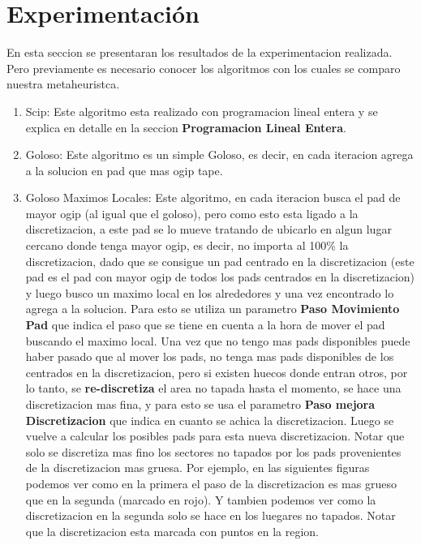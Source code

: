 \newpage
\section{Experimentación}\label{sec:experimentacion}

En esta seccion se presentaran los resultados de la experimentacion realizada. Pero previamente es necesario conocer los algoritmos con los cuales se comparo nuestra metaheuristca.

\begin{enumerate}
\item Scip: Este algoritmo esta realizado con programacion lineal entera y se explica en detalle en la seccion \textbf{Programacion Lineal Entera}.
\item Goloso: Este algoritmo es un simple Goloso, es decir, en cada iteracion agrega a la solucion en pad que mas ogip tape.
\item Goloso Maximos Locales: Este algoritmo, en cada iteracion busca el pad de mayor ogip (al igual que el goloso), pero como esto esta ligado a la discretizacion, a este pad se lo mueve tratando de ubicarlo en algun lugar cercano donde tenga mayor ogip, es decir, no importa al 100\% la discretizacion, dado que se consigue un pad centrado en la discretizacion (este pad es el pad con mayor ogip de todos los pads centrados en la discretizacion) y luego busco un maximo local en los alrededores y una vez encontrado lo agrega a la solucion.
Para esto se utiliza un parametro \textbf{Paso Movimiento Pad} que indica el paso que se tiene en cuenta a la hora de mover el pad buscando el maximo local. 
Una vez que no tengo mas pads disponibles puede haber pasado que al mover los pads, no tenga mas pads disponibles de los centrados en la discretizacion, pero si existen huecos donde entran otros, por lo tanto, se \textbf{re-discretiza} el area no tapada hasta el momento, se hace una discretizacion mas fina, y para esto se usa el parametro \textbf{Paso mejora Discretizacion} que indica en cuanto se achica la discretizacion. Luego se vuelve a calcular los posibles pads para esta nueva discretizacion. Notar que solo se discretiza mas fino los sectores no tapados por los pads provenientes de la discretizacion mas gruesa.
Por ejemplo, en las siguientes figuras podemos ver como en la primera el paso de la discretizacion es mas grueso que en la segunda (marcado en rojo). Y tambien podemos ver como la discretizacion en la segunda solo se hace en los luegares no tapados. Notar que la discretizacion esta marcada con puntos en la region.


\end{enumerate}
